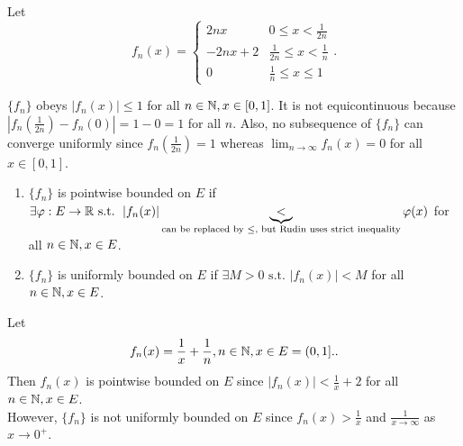 \begin{example}
	Let \[
		f_{n}(x)=\begin{cases}
			2nx    & 0\le x< \frac{1}{2n}           \\
			-2nx+2 & \frac{1}{2n}\le x< \frac{1}{n} \\
			0      & \frac{1}{n}\le x\le 1
		\end{cases}
		.\]
	\begin{center}
	\end{center}
	$\{f_{n}\}$ obeys $\left|f_{n}(x)\right| \le 1$ for all $ n \in \mathbb{N}, x \in [0,1]$. It is not equicontinuous because $\left|f_{n}(\frac{1}{2n})-f_{n}(0)\right|=1-0=1$ for all $n$. Also, no subsequence of $\{f_{n}\} $ can converge uniformly since $f_{n}(\frac{1}{2n})=1$ whereas $\lim_{n\to \infty}{f_{n}(x)}=0$ for all $x \in [0,1]$.
\end{example}

\begin{define}[7.19]
	\label{def:7.19}
	\begin{enumerate}
		\item $\{f_{n}\}$ is pointwise bounded on $E$ if $\exists{\varphi: E\to \ensuremath{\mathbb{R}}} \text{ s.t. } \left|f_{n}(x)\right| \underbrace{<}_{\text{can be replaced by }\le \text{, but Rudin uses strict inequality}} \varphi(x) $ for all $n \in \mathbb{N}, x \in E$.
		\item $\{f_{n}\}$ is uniformly bounded on $E$ if $\exists{M>0} \text{ s.t. } \left|f_{n}(x)\right|<M$ for all $n \in \mathbb{N}, x \in E$.
	\end{enumerate}
\end{define}

\begin{example}
	Let \[
		f_{n}(x)=\frac{1}{x}+\frac{1}{n}, n \in \mathbb{N}, x \in E=(0,1].
		.\]
	Then $f_n(x)$ is pointwise bounded on $E$ since $\left|f_{n}(x)\right|<\frac{1}{x}+2$ for all $n \in \mathbb{N}, x \in E$.\\
	However, $\{f_{n}\}$ is not uniformly bounded on $E$ since $f_{n}(x)>\frac{1}{x}$ and $\frac{1}{x\to \infty}$ as $x\to 0^{+}$.
\end{example}

